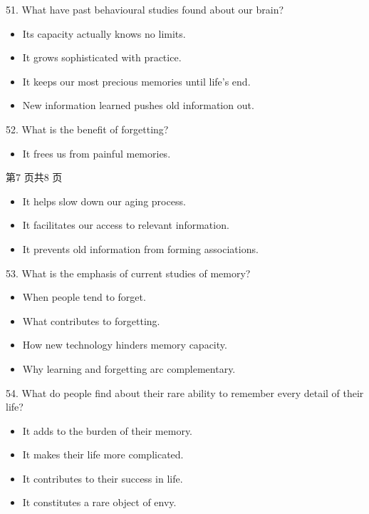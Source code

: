 \documentclass[UTF8,11pt]{ctexart}
\begin{document}
51. What have past behavioural studies found about our brain?


\begin{itemize}[leftmargin=2em,itemsep=.2em,topsep=.4em]\item[A.] Its capacity actually knows no limits.
\item[B.] It grows sophisticated with practice.
\item[C.] It keeps our most precious memories until life’s end.
\item[D.] New information learned pushes old information out.
\end{itemize}

52. What is the benefit of forgetting?


\begin{itemize}[leftmargin=2em,itemsep=.2em,topsep=.4em]\item[A.] It frees us from painful memories.
\end{itemize}

第7 页共8 页


\begin{itemize}[leftmargin=2em,itemsep=.2em,topsep=.4em]\item[B.] It helps slow down our aging process.
\item[C.] It facilitates our access to relevant information.
\item[D.] It prevents old information from forming associations.
\end{itemize}

53. What is the emphasis of current studies of memory?


\begin{itemize}[leftmargin=2em,itemsep=.2em,topsep=.4em]\item[A.] When people tend to forget.
\item[B.] What contributes to forgetting.
\item[C.] How new technology hinders memory capacity.
\item[D.] Why learning and forgetting arc complementary.
\end{itemize}

54. What do people find about their rare ability to remember every detail of their life?


\begin{itemize}[leftmargin=2em,itemsep=.2em,topsep=.4em]\item[A.] It adds to the burden of their memory.
\item[B.] It makes their life more complicated.
\item[C.] It contributes to their success in life.
\item[D.] It constitutes a rare object of envy.
\end{itemize}
\end{document}
